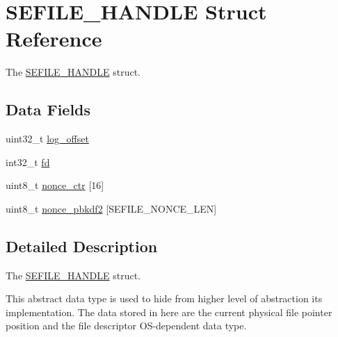 \hypertarget{struct_s_e_f_i_l_e___h_a_n_d_l_e}{\section{S\-E\-F\-I\-L\-E\-\_\-\-H\-A\-N\-D\-L\-E Struct Reference}
\label{struct_s_e_f_i_l_e___h_a_n_d_l_e}
}


The \hyperlink{struct_s_e_f_i_l_e___h_a_n_d_l_e}{S\-E\-F\-I\-L\-E\-\_\-\-H\-A\-N\-D\-L\-E} struct.  


\subsection*{Data Fields}
\begin{DoxyCompactItemize}
\item 
uint32\-\_\-t \hyperlink{struct_s_e_f_i_l_e___h_a_n_d_l_e_a507fef27d36d8ad4550276f9abf84ebb}{log\-\_\-offset}
\item 
int32\-\_\-t \hyperlink{struct_s_e_f_i_l_e___h_a_n_d_l_e_a17bc7f2e296f61d7758cb18e68d41375}{fd}
\item 
uint8\-\_\-t \hyperlink{struct_s_e_f_i_l_e___h_a_n_d_l_e_a37935da2e79760bd04e32e05e5922975}{nonce\-\_\-ctr} \mbox{[}16\mbox{]}
\item 
uint8\-\_\-t \hyperlink{struct_s_e_f_i_l_e___h_a_n_d_l_e_a6d2cb56237e6a99def8f9e9e54a46489}{nonce\-\_\-pbkdf2} \mbox{[}S\-E\-F\-I\-L\-E\-\_\-\-N\-O\-N\-C\-E\-\_\-\-L\-E\-N\mbox{]}
\end{DoxyCompactItemize}


\subsection{Detailed Description}
The \hyperlink{struct_s_e_f_i_l_e___h_a_n_d_l_e}{S\-E\-F\-I\-L\-E\-\_\-\-H\-A\-N\-D\-L\-E} struct. 

This abstract data type is used to hide from higher level of abstraction its implementation. The data stored in here are the current physical file pointer position and the file descriptor O\-S-\/dependent data type. 

